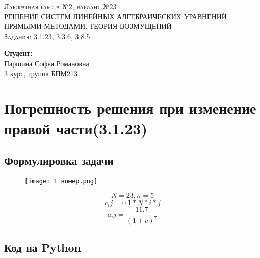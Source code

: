 \documentclass[a4paper,12pt]{article}
\newenvironment{longlisting}{\captionsetup{type=listing}}{}
\begin{document}
\begin{titlepage}
  \begin{center}
    \large
     
    \textbf{}

 

    
    \vfill
     
     
   
    \vfill
 
    \textsc{Лаборатная работа №2, вариант №23}\\[5mm]
     
    {\LARGE РЕШЕНИЕ СИСТЕМ ЛИНЕЙНЫХ АЛГЕБРАИЧЕСКИХ УРАВНЕНИЙ
ПРЯМЫМИ МЕТОДАМИ. ТЕОРИЯ ВОЗМУЩЕНИЙ\\[2mm]
    }
    \textsc{Задания: 3.1.23, 3.3.6, 3.8.5}\\[5mm]
  \bigskip
     
    
\end{center}
\vfill
 

 
\hfill\begin{flushright}
  \textbf{Студент:}\\
  Паршина Софья Романовна \\
  3 курс, группа БПМ213
\end{flushright}%
\vfill

\end{titlepage}


\tableofcontents

\section{Погрешность решения при изменение правой части(3.1.23)}
\subsection{Формулировка задачи}
\begin{figure}[H]
\centering
  \texttt{[image: 1 номер.png]}
\end{figure}

$$N = 23, n = 5$$
$$ c_ij=0.1*N*i*j $$
$$a_ij=\frac{11.7}{(1+c)^7}$$
\subsection{Код на Python}

\begin{longlisting}
\inputminted{python}{cond.py}
\end{longlisting}
\end{document}
